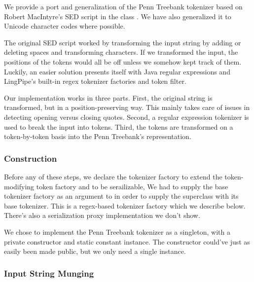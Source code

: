 We provide a port and generalization of the Penn Treebank tokenizer
based on Robert MacIntyre's SED script in the class
.  We have also generalized it
to Unicode character codes where possible.  

The original SED script worked by transforming the input string by
adding or deleting spaces and transforming characters.  If we transformed
the input, the positions of the tokens would all be off unless we
somehow kept track of them.  Luckily, an easier solution presents itself
with Java regular expressions and LingPipe's built-in regex tokenizer
factories and token filter.

Our implementation works in three parts.  First, the original string
is transformed, but in a position-preserving way.  This mainly takes
care of issues in detecting opening versus closing quotes.  Second,
a regular expression tokenizer is used to break the input into tokens.
Third, the tokens are transformed on a token-by-token basis into
the Penn Treebank's representation. 

\subsubsection{Construction}

Before any of these steps, we declare the tokenizer factory to extend
the token-modifying token factory and to be serailizable,
%
%
We had to supply the base tokenizer factory as an argument
to  in order to supply the superclass with its
base tokenizer.  This is a regex-based tokenizer factory which
we describe below.  There's also a serialization proxy implementation
we don't show.

We chose to implement the Penn Treebank tokenizer as a singleton, with
a private constructor and static constant instance.  The constructor
could've just as easily been made public, but we only need a single
instance.

\subsubsection{Input String Munging}


